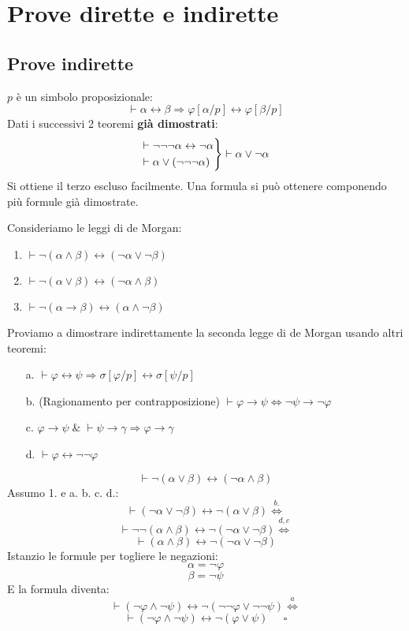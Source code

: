 \documentclass{article}
\theoremstyle{break}
\theoremstyle{break}
\theoremstyle{break}
\theoremstyle{break}
\begin{document}
\section{Prove dirette e indirette}
\subsection{Prove indirette}
\( p \) è un simbolo proposizionale:
\[
    \vdash \alpha \leftrightarrow \beta \Rightarrow \varphi[\alpha/p] \leftrightarrow \varphi[\beta/p]
\] 
Dati i successivi 2 teoremi \textbf{già dimostrati}:
\[
    \begin{rcases}
        \vdash \neg \neg \neg \alpha \leftrightarrow \neg \alpha \\
        \vdash \alpha \vee (\neg \neg \neg \alpha)
    \end{rcases} \vdash \alpha \vee \neg \alpha
\] 
Si ottiene il terzo escluso facilmente.
Una formula si può ottenere componendo più formule già dimostrate.

Consideriamo le leggi di de Morgan:
\begin{enumerate}
    \item \( \vdash \neg(\alpha \wedge \beta) \leftrightarrow (\neg \alpha \vee \neg \beta) \) 
    \item \( \vdash \neg (\alpha \vee \beta) \leftrightarrow (\neg \alpha \wedge \beta) \) 
    \item \( \vdash \neg (\alpha \to \beta) \leftrightarrow (\alpha \wedge \neg \beta) \) 
\end{enumerate}
Proviamo a dimostrare indirettamente la seconda legge di de Morgan usando altri teoremi:
\begin{enumerate}
    \item[a.] \( \vdash \varphi \leftrightarrow \psi \Rightarrow \sigma[\varphi/p] \leftrightarrow \sigma[\psi/p] \) 
    \item[b.] (Ragionamento per contrapposizione) \( \vdash \varphi \to \psi \Leftrightarrow \neg \psi \to \neg \varphi\) 
    \item[c.] \( \varphi \to \psi\; \& \; \vdash \psi \to \gamma \Rightarrow \varphi \to \gamma \)
    \item[d.] \( \vdash \varphi \leftrightarrow \neg \neg \varphi \) 
\end{enumerate}
\begin{example}
   \[
   \vdash \neg (\alpha \vee \beta) \leftrightarrow (\neg \alpha \wedge \beta)
   \]  
   Assumo 1. e a. b. c. d.:
\[
    \vdash (\neg \alpha \vee \neg \beta) \leftrightarrow \neg (\alpha \vee \beta) \stackrel{b.}{\Leftrightarrow}
\] 
\[
    \vdash \neg \neg (\alpha \wedge \beta) \leftrightarrow \neg (\neg \alpha \vee \neg \beta) \stackrel{d, c}{\Leftrightarrow}
\] 
\[
 \vdash   (\alpha \wedge \beta) \leftrightarrow \neg (\neg \alpha \vee \neg \beta)
\] 
Istanzio le formule per togliere le negazioni:
\[
\alpha = \neg \varphi
\] 
\[
\beta = \neg \psi
\] 
E la formula diventa:
\[
    \vdash (\neg \varphi \wedge \neg \psi) \leftrightarrow \neg(\neg \neg \varphi \vee \neg \neg \psi) \stackrel{a}{\Leftrightarrow}
\] 
\[
\vdash (\neg \varphi \wedge \neg \psi) \leftrightarrow \neg(\varphi \vee \psi)\;\;\;\;\; \square
\] 
\end{example}
\end{document}
